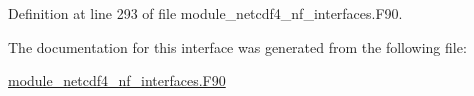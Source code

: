 Definition at line 293 of file module\+\_\+netcdf4\+\_\+nf\+\_\+interfaces.\+F90.



The documentation for this interface was generated from the following file\+:\begin{DoxyCompactItemize}
\item 
\hyperlink{module__netcdf4__nf__interfaces_8F90}{module\+\_\+netcdf4\+\_\+nf\+\_\+interfaces.\+F90}\end{DoxyCompactItemize}
